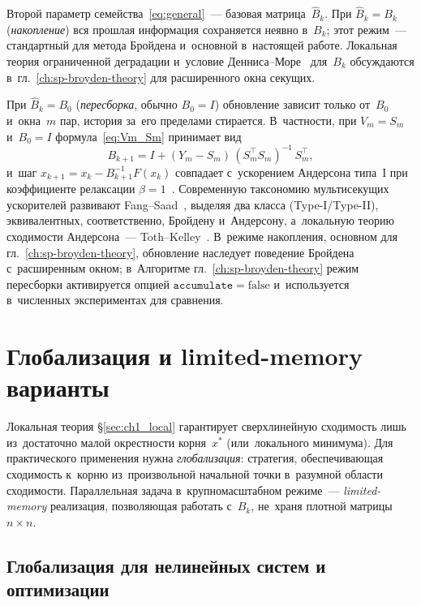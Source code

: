 Второй параметр семейства~\eqref{eq:general}~--- базовая
матрица~$\widehat{B}_k$. При $\widehat{B}_k=B_k$ (\emph{накопление})
вся прошлая информация сохраняется неявно в~$B_k$; этот режим~---
стандартный для метода Бройдена и~основной в~настоящей работе.
Локальная теория ограниченной деградации и~условие
Денниса--Море~\cite{dennis1974,dennis1996} для~$B_k$ обсуждаются
в~гл.~\ref{ch:sp-broyden-theory} для расширенного окна секущих.

При $\widehat{B}_k=B_0$ (\emph{пересборка}, обычно $B_0=I$) обновление
зависит только от~$B_0$ и~окна~$m$ пар, история за~его пределами
стирается. В~частности, при $V_m=S_m$ и~$B_0=I$
формула~\eqref{eq:Vm_Sm} принимает вид
\begin{equation}\label{eq:anderson}
  B_{k+1} = I + (Y_m - S_m)\,(S_m^\top S_m)^{-1}\,S_m^\top,
\end{equation}
и~шаг $x_{k+1}=x_k - B_{k+1}^{-1} F(x_k)$ совпадает с~ускорением
Андерсона типа~I при коэффициенте релаксации
$\beta=1$~\cite{anderson1965,walker2011,fang2009}. Современную
таксономию мультисекущих ускорителей развивают
Fang--Saad~\cite{fang2009}, выделяя два класса (Type-I/Type-II),
эквивалентных, соответственно, Бройдену и~Андерсону, а~локальную
теорию сходимости Андерсона~--- Toth--Kelley~\cite{toth2015}. В~режиме
накопления, основном для гл.~\ref{ch:sp-broyden-theory}, обновление
наследует поведение Бройдена с~расширенным окном; в~Алгоритме
гл.~\ref{ch:sp-broyden-theory} режим пересборки активируется опцией
$\mathtt{accumulate}=\text{false}$ и~используется в~численных
экспериментах для сравнения.


\section{Глобализация и limited-memory варианты}\label{sec:ch1_global}

Локальная теория \S\ref{sec:ch1_local} гарантирует сверхлинейную
сходимость лишь из~достаточно малой окрестности корня~$x^*$
(или~локального минимума). Для практического применения нужна
\emph{глобализация}: стратегия, обеспечивающая сходимость к~корню
из~произвольной начальной точки в~разумной области сходимости. Параллельная
задача в~крупномасштабном режиме~--- \emph{limited-memory} реализация,
позволяющая работать с~$B_k$, не~храня плотной матрицы $n\times n$.

\subsection{Глобализация для нелинейных систем и оптимизации}

